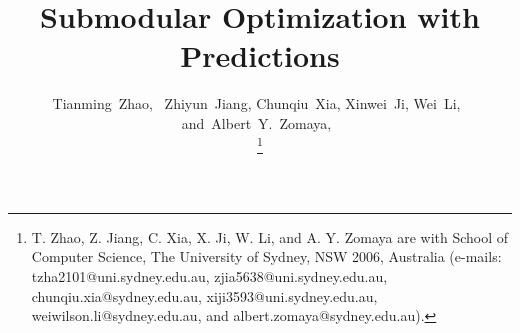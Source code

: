 \documentclass[journal,compsoc]{IEEEtran}
\begin{document}
\title{Submodular Optimization with Predictions}
%
%
%
%

\author{Tianming~Zhao,~
        Zhiyun~Jiang, 
        Chunqiu~Xia,
        Xinwei~Ji,
        Wei~Li,~
        and~Albert~Y.~Zomaya,~%

\thanks{T. Zhao, Z. Jiang, C. Xia, X. Ji, W. Li, and A. Y. Zomaya are with School of Computer Science, The University of Sydney, NSW 2006, Australia (e-mails: tzha2101@uni.sydney.edu.au, zjia5638@uni.sydney.edu.au, chunqiu.xia@sydney.edu.au, xiji3593@uni.sydney.edu.au, weiwilson.li@sydney.edu.au, and albert.zomaya@sydney.edu.au).}

}
\end{document}
